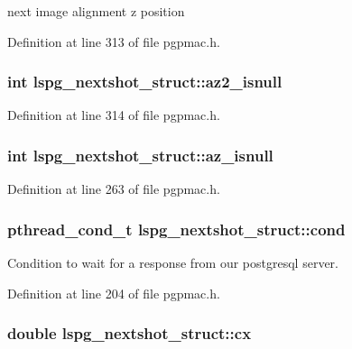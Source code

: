 next image alignment z position 



Definition at line 313 of file pgpmac.\-h.

\hypertarget{structlspg__nextshot__struct_a95d080f13a4e02b9aa883821ee3e721c}{
\subsubsection[{az2\-\_\-isnull}]{\setlength{\rightskip}{0pt plus 5cm}int lspg\-\_\-nextshot\-\_\-struct\-::az2\-\_\-isnull}}\label{structlspg__nextshot__struct_a95d080f13a4e02b9aa883821ee3e721c}


Definition at line 314 of file pgpmac.\-h.

\hypertarget{structlspg__nextshot__struct_aaebd6d432810313294b5fed5f4445cb1}{
\subsubsection[{az\-\_\-isnull}]{\setlength{\rightskip}{0pt plus 5cm}int lspg\-\_\-nextshot\-\_\-struct\-::az\-\_\-isnull}}\label{structlspg__nextshot__struct_aaebd6d432810313294b5fed5f4445cb1}


Definition at line 263 of file pgpmac.\-h.

\hypertarget{structlspg__nextshot__struct_afc773a9eefc173aa98d5c2889e1d7669}{
\subsubsection[{cond}]{\setlength{\rightskip}{0pt plus 5cm}pthread\-\_\-cond\-\_\-t lspg\-\_\-nextshot\-\_\-struct\-::cond}}\label{structlspg__nextshot__struct_afc773a9eefc173aa98d5c2889e1d7669}


Condition to wait for a response from our postgresql server. 



Definition at line 204 of file pgpmac.\-h.

\hypertarget{structlspg__nextshot__struct_ad9eb2013fa6f295f72f0891fe98c863f}{
\subsubsection[{cx}]{\setlength{\rightskip}{0pt plus 5cm}double lspg\-\_\-nextshot\-\_\-struct\-::cx}}\label{structlspg__nextshot__struct_ad9eb2013fa6f295f72f0891fe98c863f}


